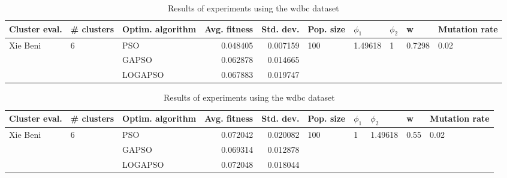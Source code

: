 \documentclass{article}
\begin{document}
\begin{table}
\centering
\caption{Results of experiments using the wdbc dataset}
\begin{tabular}{lllrrlllll}
\toprule
            Cluster eval. &        \# clusters & Optim. algorithm &  Avg. fitness &  Std. dev. &            Pop. size &               $\phi_{1}$ &         $\phi_{2}$ &                       w &         Mutation rate \\
\midrule
\multirow{3}{*}{Xie Beni} & \multirow{3}{*}{6} &              PSO &      0.048405 &   0.007159 & \multirow{3}{*}{100} & \multirow{3}{*}{1.49618} & \multirow{3}{*}{1} & \multirow{3}{*}{0.7298} & \multirow{3}{*}{0.02} \\
                          &                    &            GAPSO &      0.062878 &   0.014665 &                      &                          &                    &                         &                       \\
                          &                    &          LOGAPSO &      0.067883 &   0.019747 &                      &                          &                    &                         &                       \\
\bottomrule
\end{tabular}
\end{table}
\begin{table}
\centering
\caption{Results of experiments using the wdbc dataset}
\begin{tabular}{lllrrlllll}
\toprule
            Cluster eval. &        \# clusters & Optim. algorithm &  Avg. fitness &  Std. dev. &            Pop. size &         $\phi_{1}$ &               $\phi_{2}$ &                     w &         Mutation rate \\
\midrule
\multirow{3}{*}{Xie Beni} & \multirow{3}{*}{6} &              PSO &      0.072042 &   0.020082 & \multirow{3}{*}{100} & \multirow{3}{*}{1} & \multirow{3}{*}{1.49618} & \multirow{3}{*}{0.55} & \multirow{3}{*}{0.02} \\
                          &                    &            GAPSO &      0.069314 &   0.012878 &                      &                    &                          &                       &                       \\
                          &                    &          LOGAPSO &      0.072048 &   0.018044 &                      &                    &                          &                       &                       \\
\bottomrule
\end{tabular}
\end{table}
\end{document}
